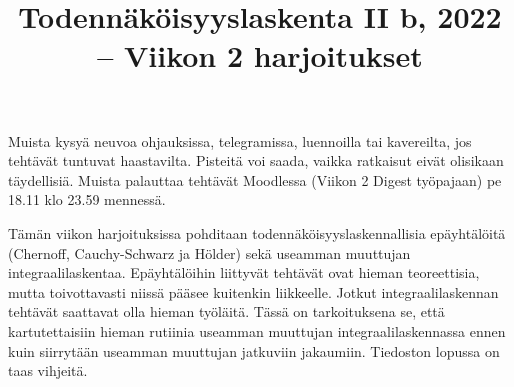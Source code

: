 \documentclass[11pt,a4paper]{amsart}
\title{Todennäköisyyslaskenta II b, 2022 -- Viikon 2 harjoitukset}
\newcommand{\1}{\mathbf{1}}
\begin{document}
\maketitle


Muista kysyä neuvoa ohjauksissa, telegramissa, luennoilla tai kavereilta, jos tehtävät tuntuvat haastavilta. Pisteitä voi saada, vaikka ratkaisut eivät olisikaan täydellisiä.  Muista palauttaa tehtävät Moodlessa (Viikon 2 Digest työpajaan) pe 18.11 klo 23.59 mennessä.

\medskip 

Tämän viikon harjoituksissa pohditaan todennäköisyyslaskennallisia epäyhtälöitä (Chernoff, Cauchy-Schwarz ja Hölder) sekä useamman muuttujan integraalilaskentaa. Epäyhtälöihin liittyvät tehtävät ovat hieman teoreettisia, mutta toivottavasti niissä pääsee kuitenkin liikkeelle. Jotkut integraalilaskennan tehtävät saattavat olla hieman työläitä. Tässä on tarkoituksena se, että kartutettaisiin hieman rutiinia useamman muuttujan integraalilaskennassa ennen kuin siirrytään useamman muuttujan jatkuviin jakaumiin. Tiedoston lopussa on taas vihjeitä.
\end{document}
